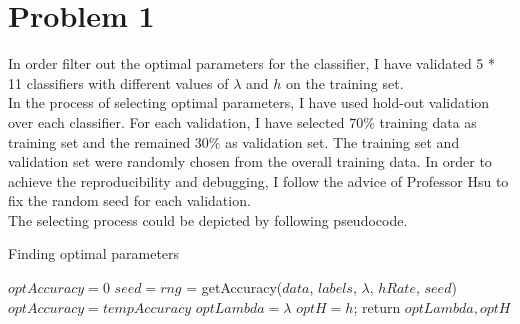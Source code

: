 \documentclass[twoside,11pt]{homework}
\begin{document}
\maketitle

\section*{Problem 1}
\indent
In order filter out the optimal parameters for the classifier, I have validated  5 * 11 classifiers with different values of $\lambda$ and $h$ on the training set. \\
\indent
In the process of selecting optimal parameters, I have used hold-out validation over each classifier. For each validation, I have selected $70\%$ training data as training set and the remained $30\%$ as validation set. The training set and validation set were randomly chosen from the overall training data. 
In order to achieve the reproducibility and debugging, I follow the advice of Professor  Hsu to fix the random seed for each validation. \\
The selecting process could be depicted by following pseudocode.\\
\begin{algorithm}
\caption{Finding optimal parameters}
\begin{algorithmic} 
\STATE $optAccuracy = 0$
\STATE $seed	=  rng$
\STATE [$tempAccuracy$, $h$] = getAccuracy($data$, $labels$, $\lambda$, $hRate$, $seed$)
\STATE $optAccuracy = tempAccuracy$
\STATE $optLambda = \lambda$
\STATE $optH = h$;
\ENDIF
\ENDFOR
\ENDFOR
\STATE return $optLambda, optH$
\end{algorithmic}
\end{algorithm}
\end{document}
